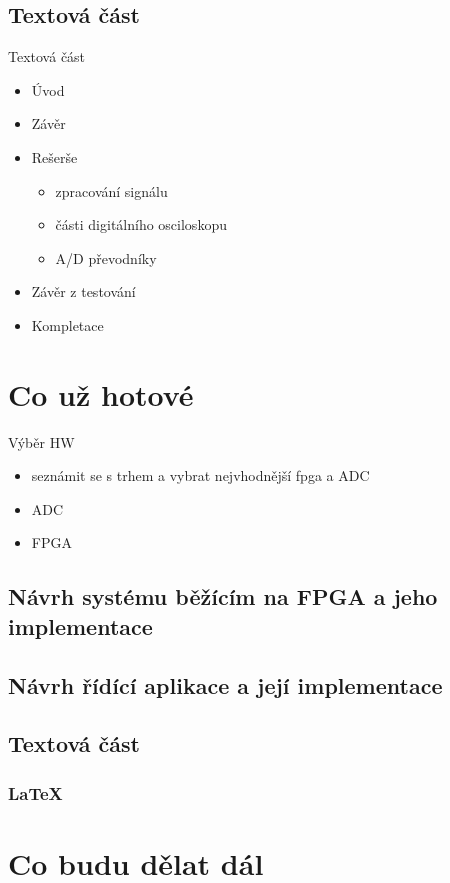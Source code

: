 \documentclass{beamer}
\begin{document}
	\subsection{Textová část}
	\begin{frame}{Textová část}
		\begin{itemize}
			\item Úvod
			\item Závěr
			\item Rešerše
			\begin{itemize}  %
				\item zpracování signálu
				\item části digitálního osciloskopu
				\item A/D převodníky
			\end{itemize}
			\item Závěr z testování
			\item Kompletace
		\end{itemize}
	\end{frame}
		
	
\section{Co už hotové}
	\begin{frame}{Výběr HW}
		\begin{itemize}
			\item seznámit se s trhem a vybrat nejvhodnější fpga a ADC
			\item ADC 
			\item FPGA
			\end{itemize}
		\end{frame}
	\subsection{Návrh systému běžícím na FPGA a jeho implementace}
	\subsection{Návrh řídící aplikace a její implementace}
	\subsection{Textová část}
	\subsubsection{LaTeX}


\section{Co budu dělat dál}
\end{document}

